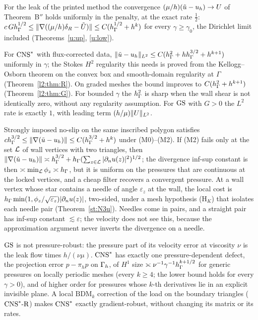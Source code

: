 \begin{theoremU}
For the leak of the printed method the convergence $(\mu/h)(\tilde u-u_h)\to U$ of Theorem~B$''$ holds uniformly in the penalty, at the exact rate $\frac12$: $c\,Gh_\Gamma^{1/2}\le\lVert \nabla((\mu/h)\delta_R-\tilde U)\rVert\le C(h_\Gamma^{1/2}+h^k)$ for every $\gamma\ge\gamma_0$, the Dirichlet limit included (Theorems~\ref{u:up}, \ref{u:low}).
\end{theoremU}

\begin{theoremL}
For $\mathrm{CNS}^\ast$ with flux-corrected data, $\lVert \tilde u-u_h\rVert_{L^2}\le C(h_\Gamma^2+hh_\Gamma^{3/2}+h^{k+1})$ uniformly in $\gamma$; the Stokes $H^2$ regularity this needs is proved from the Kellogg--Osborn theorem on the convex box and smooth-domain regularity at $\Gamma$ (Theorem~\ref{l2:thm:R}). On graded meshes the bound improves to $C(h_\Gamma^2+h^{k+1})$ (Theorem~\ref{l2:thm:G}). For bounded $\gamma$ the $h_\Gamma^2$ is sharp when the wall shear is not identically zero, without any regularity assumption. For $\mathrm{GS}$ with $G>0$ the $L^2$ rate is exactly $1$, with leading term $(h/\mu)\lVert U\rVert_{L^2}$.
\end{theoremL}

\begin{theoremS}
Strongly imposed no-slip on the same inscribed polygon satisfies $ch_\Gamma^{3/2}\le\lVert \nabla(\tilde u-u_h)\rVert\le C(h_\Gamma^{3/2}+h^k)$ under (M0)--(M2). If (M2) fails only at the set $\mathcal L$ of wall vertices with two triangles, then $\lVert \nabla(\tilde u-u_h)\rVert\asymp h_\Gamma^{3/2}+h_\Gamma(\sum_{z\in\mathcal L}|\partial_n u(z)|^2)^{1/2}$; the divergence inf-sup constant is then $\asymp\min_{\mathcal L}\phi_z\asymp h_\Gamma$, but it is uniform on the pressures that are continuous at the locked vertices, and a cheap filter recovers a convergent pressure. At a wall vertex whose star contains a needle of angle $\varepsilon_z$ at the wall, the local cost is $h_\Gamma\min(1,\phi_z/\sqrt{\varepsilon_z})|\partial_n u(z)|$, two-sided, under a mesh hypothesis (H$_K$) that isolates each needle pair (Theorem~\ref{st:N3u}). Needles come in pairs, and a straight pair has inf-sup constant $\lesssim\varepsilon$; the velocity does not see this, because the approximation argument never inverts the divergence on a needle.
\end{theoremS}

\begin{theoremT}
$\mathrm{GS}$ is not pressure-robust: the pressure part of its velocity error at viscosity $\nu$ is the leak flow times $h/(\nu\mu)$. $\mathrm{CNS}^\ast$ has exactly one pressure-dependent defect, the projection error $p-\pi_hp$ on $\Gamma_h$, of $H^1$ size $\asymp\nu^{-1}\gamma^{-1}h_\Gamma^{k+1/2}$ for generic pressures on locally periodic meshes (every $k\ge4$; the lower bound holds for every $\gamma>0$), and of higher order for pressures whose $k$-th derivatives lie in an explicit invisible plane. A local $\mathrm{BDM}_k$ correction of the load on the boundary triangles ($\mathrm{CNS}^\ast\text{-R}$) makes $\mathrm{CNS}^\ast$ exactly gradient-robust, without changing its matrix or its rates.
\end{theoremT}

